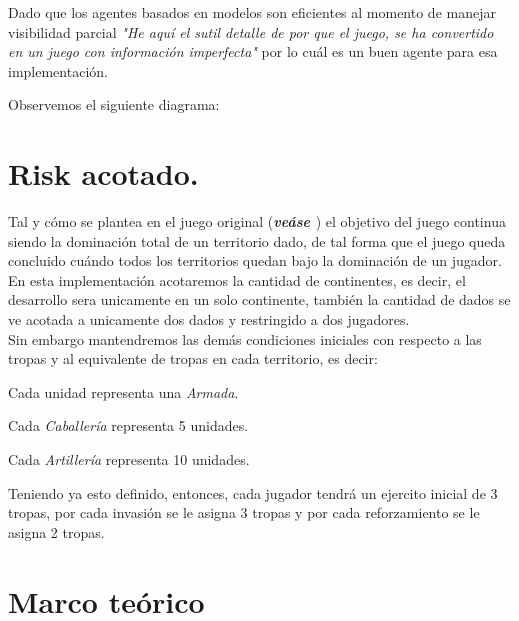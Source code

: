 \documentclass[12pt]{article}
\begin{document}
Dado que los agentes basados en modelos son eficientes al momento de manejar visibilidad parcial\cite{russell2004inteligencia} \textit{"He aqu\'i el sutil detalle de por que el juego, se ha convertido en un juego con informaci\'on imperfecta"} por lo cu\'al es un buen agente para esa implementaci\'on.

Observemos el siguiente diagrama:






\section{Risk acotado.}

Tal y c\'omo se plantea en el juego original (\textbf{\textit{ve\'ase \cite{RISK}}}) el objetivo del juego continua siendo la dominaci\'on total de un territorio dado, de tal forma
que el juego queda concluido cu\'ando todos los territorios quedan bajo la dominaci\'on de 
un jugador.\\
En esta implementaci\'on acotaremos la cantidad de continentes, es decir, el desarrollo sera unicamente en un solo continente, tambi\'en la cantidad de dados se ve acotada a unicamente dos dados y restringido a dos jugadores.\\

Sin embargo mantendremos las dem\'as condiciones iniciales con respecto a las tropas y al equivalente de tropas en cada territorio, es decir:
\begin{list}{*}{}
\item Cada unidad representa una \textit{Armada}.
\item Cada \textit{Caballer\'ia} representa 5 unidades.
\item Cada \textit{Artiller\'ia} representa 10 unidades.
\end{list}

Teniendo ya esto definido, entonces, cada jugador tendr\'a un ejercito inicial de 3 tropas, por cada invasi\'on
se le asigna 3 tropas y por cada reforzamiento se le asigna 2 tropas.


\section{Marco te\'orico}
\end{document}
